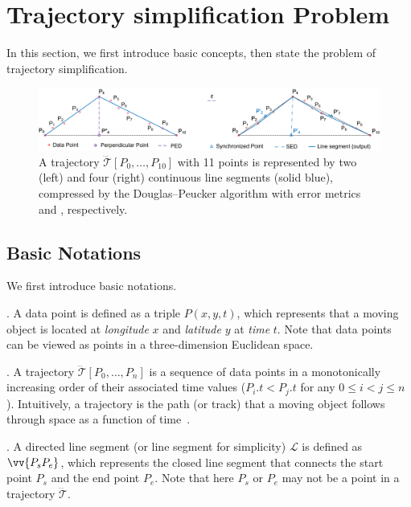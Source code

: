 \section{Trajectory simplification Problem}
In this section, we first introduce basic concepts, then state the problem of trajectory simplification.%



\begin{figure}[tb!]
	\centering
	\vspace{-1ex}
	\includegraphics[scale=0.66]{figures/Fig-DP.png}
	\vspace{-2ex}
	\caption{\small A trajectory $\dddot{\mathcal{T}}[P_0, \ldots, P_{10}]$  with 11 points is represented by two (left) and four (right) continuous line segments (solid blue), compressed by the Douglas--Peucker algorithm \cite{Douglas:Peucker} with error metrics \ped and \sed, respectively.}
	\vspace{-2ex}
	\label{fig:notations}
\end{figure}



\subsection{Basic Notations}
\label{subsec-notation}

We first introduce basic notations.

. A data point is defined as a triple $P(x, y, t)$, which represents that a moving object is located at {\em longitude} $x$ and {\em latitude} $y$ at {\em time} $t$. Note that data points can be viewed as points in a three-dimension Euclidean space.

. A trajectory $\dddot{\mathcal{T}}[P_0, \ldots, P_n]$ is a sequence of data points in a monotonically increasing order of their associated time values (\ie $P_i.t < P_j.t$ for any $0\le i<j\le n$). Intuitively, a trajectory is the path (or track) that a moving object follows through space as a function of time~\cite{physics-trajectory}.

. A directed line segment (or line segment for simplicity) $\mathcal{L}$ is defined as $\vv{P_{s}P_{e}}$, which represents the closed line segment that connects the start point $P_s$ and the end point $P_e$.
Note that here $P_s$ or $P_e$ may not be a point in a trajectory $\dddot{\mathcal{T}}$.

